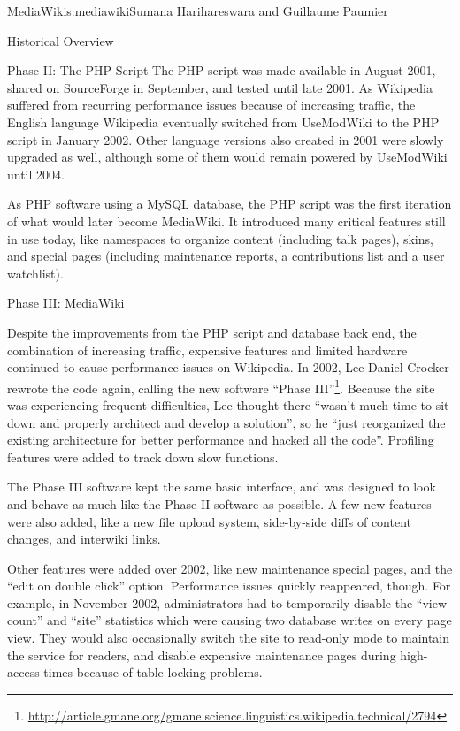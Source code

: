 \begin{aosachapter}{MediaWiki}{s:mediawiki}{Sumana Harihareswara and Guillaume Paumier}
\begin{aosasect1}{Historical Overview}
\begin{aosasect2}{Phase II: The PHP Script}
The PHP script was made available in August 2001, shared on
SourceForge in September, and tested until late 2001. As Wikipedia
suffered from recurring performance issues because of increasing
traffic, the English language Wikipedia eventually switched from
UseModWiki to the PHP script in January 2002. Other language versions
also created in 2001 were slowly upgraded as well, although some of
them would remain powered by UseModWiki until 2004.

As PHP software using a MySQL database, the PHP script was the first
iteration of what would later become MediaWiki. It introduced
many critical features still in use today, like namespaces to organize
content (including talk pages), skins, and special pages (including
maintenance reports, a contributions list and a user watchlist).

\end{aosasect2}

\begin{aosasect2}{Phase III: MediaWiki}

Despite the improvements from the PHP script and database back end,
the combination of increasing traffic, expensive features and limited
hardware continued to cause performance issues on Wikipedia. In 2002,
Lee Daniel Crocker rewrote the code again, calling the new software
``Phase III''\footnote{\url{http://article.gmane.org/gmane.science.linguistics.wikipedia.technical/2794}}. Because the site was experiencing frequent difficulties,
Lee thought there ``wasn't much time to sit down and properly architect
and develop a solution'', so he ``just reorganized the existing
architecture for better performance and hacked all the
code''. Profiling features were added to track down slow functions.

The Phase III software kept the same basic interface, and was designed
to look and behave as much like the Phase II software as possible. A
few new features were also added, like a new file upload system,
side-by-side diffs of content changes, and interwiki links.

Other features were added over 2002, like new maintenance special
pages, and the ``edit on double click'' option. Performance issues
quickly reappeared, though. For example, in November 2002,
administrators had to temporarily disable the ``view count'' and ``site''
statistics which were causing two database writes on every page
view. They would also occasionally switch the site to read-only mode
to maintain the service for readers, and disable expensive maintenance
pages during high-access times because of table locking problems.


\end{aosasect2}
\end{aosasect1}
\end{aosachapter}

